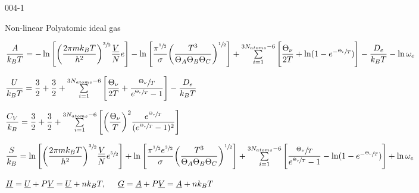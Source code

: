 \begin{mitframe}{004-1}
\begin{listone}
    \item Non-linear Polyatomic ideal gas 
       
   	\item $\dfrac{\helmholtz}{\boltz\Temp}=-\ln\Bigg[\bigg(\dfrac{2\pie\mass\boltz\Temp}{\planck^{2}}\bigg)^{\sfrac{3}{2}}\dfrac{\uline{\vol}}{\nummoles}e\Bigg]-\ln\Bigg[\dfrac{\pie^{\sfrac{1}{2}}}{\molecrad}\bigg(\dfrac{\Temp^{3}}{\dimltemp_{A}\dimltemp_{B}\dimltemp_{C}}\bigg)^{\sfrac{1}{2}}\Bigg]+\sum\limits_{i=1}^{3\nummoles_{atoms}-6}\Bigg[\dfrac{\vibrfreqfac}{2\Temp}+\ln(1-e^{-\sfrac{\vibrfreqfac}{\Temp}})\Bigg]-\dfrac{\eneatom}{\boltz\Temp}-\ln\elecdegen$
    
    
    
    \item $\dfrac{\intenergy}{\boltz\Temp}=\dfrac{3}{2}+\dfrac{3}{2}+\sum\limits_{i=1}^{3\nummoles_{atoms}-6}\Bigg[\dfrac{\vibrfreqfac}{2\Temp}+\dfrac{\sfrac{\vibrfreqfac}{\Temp}}{e^{\sfrac{\vibrfreqfac}{\Temp}}-1}\Bigg]-\dfrac{\eneatom}{\boltz\Temp}$
    
    \item $\dfrac{\cv}{\boltz}=\dfrac{3}{2}+\dfrac{3}{2}+\sum\limits_{i=1}^{3\nummoles_{atoms}-6}\Bigg[\bigg(\dfrac{\vibrfreqfac}{\Temp}\bigg)^{2}\dfrac{e^{\sfrac{\vibrfreqfac}{\Temp}}}{(e^{\sfrac{\vibrfreqfac}{\Temp}}-1)^{2}}\Bigg]$
    
    \item $\dfrac{\entropy}{\boltz}=\ln\Bigg[\bigg(\dfrac{2\pie\mass\boltz\Temp}{\planck^{2}}\bigg)^{\sfrac{3}{2}}\dfrac{\uline{\vol}}{\nummoles}e^{\sfrac{5}{2}}\Bigg]+\ln\Bigg[\dfrac{\pie^{\sfrac{1}{2}}e^{\sfrac{3}{2}}}{\molecrad}\bigg(\dfrac{\Temp^{3}}{\dimltemp_{A}\dimltemp_{B}\dimltemp_{C}}\bigg)^{\sfrac{1}{2}}\Bigg]+\sum\limits_{i=1}^{3\nummoles_{atoms}-6}\Bigg[\dfrac{\sfrac{\vibrfreqfac}{\Temp}}{e^{\sfrac{\vibrfreqfac}{\Temp}}-1}-\ln(1-e^{-\sfrac{\vibrfreqfac}{\Temp}})\Bigg]+\ln\elecdegen$          

    \item $\uline{\enthalpy}=\uline{\intenergy}+\p\uline{\vol}=\uline{\intenergy}+n\boltz\Temp,\tab \uline{\gibbs}=\uline{\helmholtz}+\p\uline{\vol}=\uline{\helmholtz}+n\boltz\Temp$
    
    
    
\end{listone}			

\end{mitframe}